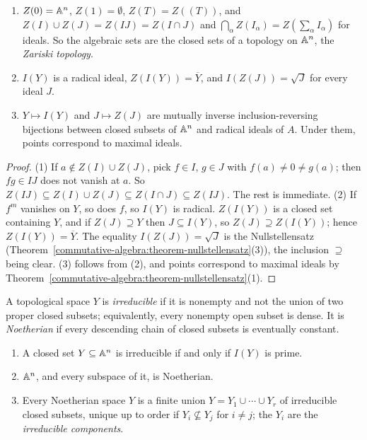 \begin{proposition}\label{varieties:proposition-zariski-topology}
\begin{enumerate}
\item $Z(0) = \mathbb{A}^n$, $Z(1) = \emptyset$, $Z(T) = Z((T))$, and $Z(I) \cup Z(J) = Z(IJ) = Z(I \cap J)$ and $\bigcap_\alpha Z(I_\alpha) = Z(\sum_\alpha I_\alpha)$ for ideals.
So the algebraic sets are the closed sets of a topology on $\mathbb{A}^n$, the \emph{Zariski topology}.
\item $I(Y)$ is a radical ideal, $Z(I(Y)) = \overline Y$, and $I(Z(J)) = \sqrt J$ for every ideal $J$.
\item $Y \mapsto I(Y)$ and $J \mapsto Z(J)$ are mutually inverse inclusion-reversing bijections between closed subsets of $\mathbb{A}^n$ and radical
ideals of $A$. Under them, points correspond to maximal ideals.
\end{enumerate}
\end{proposition}

\begin{proof}
(1) If $a \notin Z(I) \cup Z(J)$, pick $f \in I$, $g \in J$ with $f(a) \neq 0 \neq g(a)$; then $fg \in IJ$ does not vanish at $a$. So
$Z(IJ) \subseteq Z(I) \cup Z(J) \subseteq Z(I \cap J) \subseteq Z(IJ)$. The rest is immediate. (2) If $f^m$ vanishes on $Y$, so does $f$, so $I(Y)$ is
radical. $Z(I(Y))$ is a closed set containing $Y$, and if $Z(J) \supseteq Y$ then $J \subseteq I(Y)$, so $Z(J) \supseteq Z(I(Y))$; hence
$Z(I(Y)) = \overline Y$. The equality $I(Z(J)) = \sqrt J$ is the Nullstellensatz (Theorem~\ref{commutative-algebra:theorem-nullstellensatz}(3)),
the inclusion $\supseteq$ being clear. (3) follows from (2), and points correspond to maximal ideals by
Theorem~\ref{commutative-algebra:theorem-nullstellensatz}(1).
\end{proof}

\begin{definition}\label{varieties:definition-irreducible}
A topological space $Y$ is \emph{irreducible} if it is nonempty and not the union of two proper closed subsets; equivalently, every
nonempty open subset is dense. It is \emph{Noetherian} if every descending chain of closed subsets is eventually constant.
\end{definition}

\begin{proposition}\label{varieties:proposition-irreducible-components}
\begin{enumerate}
\item A closed set $Y \subseteq \mathbb{A}^n$ is irreducible if and only if $I(Y)$ is prime.
\item $\mathbb{A}^n$, and every subspace of it, is Noetherian.
\item Every Noetherian space $Y$ is a finite union $Y = Y_1 \cup \cdots \cup Y_r$ of irreducible closed subsets, unique up to order if
$Y_i \not\subseteq Y_j$ for $i \neq j$; the $Y_i$ are the \emph{irreducible components}.
\end{enumerate}
\end{proposition}

